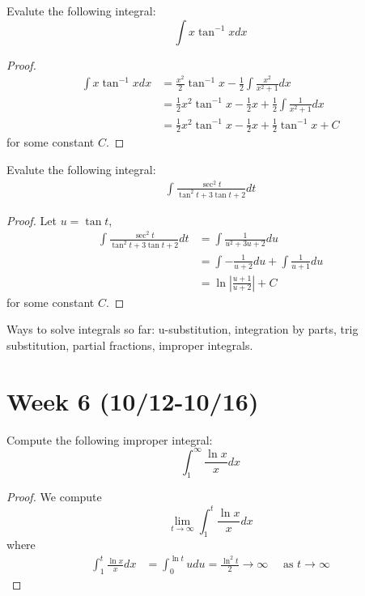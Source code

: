 \documentclass[openany]{book}
\begin{document}
\begin{prob}
    Evalute the following integral:
    \begin{equation*}
        \int x\tan^{-1}xdx
    \end{equation*}
\end{prob}
\begin{proof}
    \begin{align*}
        \int x\tan^{-1}xdx&=\frac{x^2}{2}\tan^{-1}x-\frac{1}{2}\int \frac{x^2}{x^2+1}dx\\
        &=\frac{1}{2}x^2\tan^{-1}x-\frac{1}{2}x+\frac{1}{2}\int\frac{1}{x^2+1}dx\\
        &=\frac{1}{2}x^2\tan^{-1}x-\frac{1}{2}x+\frac{1}{2}\tan^{-1}x+C
    \end{align*}
    for some constant $C$.
\end{proof}




\begin{prob}
    Evalute the following integral:
    \begin{align*}
        \int\frac{\sec^2t}{\tan^2t+3\tan t+2}dt
    \end{align*}
\end{prob}
\begin{proof}
    Let $u=\tan t$,
    \begin{align*}
        \int\frac{\sec^2t}{\tan^2t+3\tan t+2}dt&=\int \frac{1}{u^2+3u+2}du\\
        &=\int-\frac{1}{u+2}du+\int\frac{1}{u+1}du\\
        &=\ln\left|\frac{u+1}{u+2}\right|+C
    \end{align*}
    for some constant $C$.
\end{proof}



\newpage 
Ways to solve integrals so far: u-substitution, integration by parts, trig substitution, partial fractions, improper integrals.
\section*{\centering Week 6 (10/12-10/16)}
\begin{prob}
    Compute the following improper integral:
    \begin{equation*}
        \int_1^\infty\frac{\ln x}{x}dx
    \end{equation*}
\end{prob}
\begin{proof}
    We compute 
    \begin{equation*}
        \lim_{t\to\infty}\int_1^t\frac{\ln x}{x}dx
    \end{equation*}
    where
    \begin{align*}
        \int_1^t\frac{\ln x}{x}dx&=\int_0^{\ln t}udu=\frac{\ln^2t}{2}\to\infty \quad\text{ as } t\to\infty
    \end{align*}
\end{proof}
\end{document}
